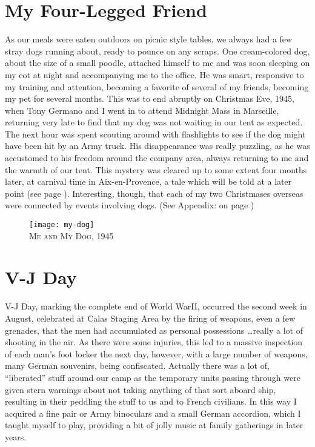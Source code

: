 \documentclass[../m3y]{subfiles}
\begin{document}
\section{My Four-Legged Friend}
As our meals were eaten outdoors on picnic style tables, we always had a few stray dogs running about, ready to pounce on any scraps. One cream-colored dog, about the size of a small poodle, attached himself to me and was soon sleeping on my cot at night and accompanying me to the office. He was smart, responsive to my training and attention, becoming a favorite of several of my friends, becoming my pet for several months. This was to end abruptly on Christmas Eve, 1945, when Tony Germano and I went in to attend Midnight Mass in Marseille, returning very late to find that my dog was not waiting in our tent as expected. The next hour was spent scouting around with flashlights to see if the dog might have been hit by an Army truck. His disappearance was really puzzling, as he was accustomed to his freedom around the company area, always returning to me and the warmth of our tent. This mystery was cleared up to some extent four months later, at carnival time in Aix-en-Provence, a tale which will be told at a later point (see page \pageref{reunited}). Interesting, though, that each of my two Christmases overseas were connected by events involving dogs. (See Appendix: \emph{} on page \pageref{luxembourg-christmas})

\begin{figure}[h]
\centering
\texttt{[image: my-dog]}\\
\medskip
{\newtimes\textsc{Me and My Dog, 1945}}
\end{figure}

\section{V-J Day}
V-J Day, marking the complete end of World War\thinspace{}II, occurred the second week in August, celebrated at Calas Staging Area by the firing of weapons, even a few grenades, that the men had accumulated as personal possessions \ldots really a lot of shooting in the air. As there were some injuries, this led to a massive inspection of each man's foot locker the next day, however, with a large number of weapons, many German souvenirs, being confiscated. Actually there was a lot of, ``liberated'' stuff around our camp as the temporary units passing through were given stern warnings about not taking anything of that sort aboard ship, resulting in their peddling the stuff to us and to French civilians. In this way I acquired a fine pair or Army binoculars and a small German accordion, which I taught myself to play, providing a bit of jolly music at family gatherings in later years.
\end{document}

